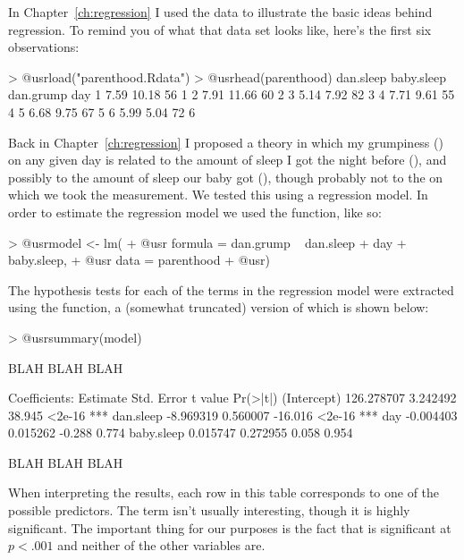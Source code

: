 
In Chapter~\ref{ch:regression} I used the  data to illustrate the basic ideas behind regression. To remind you of what that data set looks like, here's the first six observations:
\begin{rblock1}
> @usr{load("parenthood.Rdata")}
> @usr{head(parenthood)}
  dan.sleep baby.sleep dan.grump day
1      7.59      10.18        56   1
2      7.91      11.66        60   2
3      5.14       7.92        82   3
4      7.71       9.61        55   4
5      6.68       9.75        67   5
6      5.99       5.04        72   6
\end{rblock1}

\noindent
Back in Chapter~\ref{ch:regression} I proposed a theory in which my grumpiness () on any given day is related to the amount of sleep I got the night before (), and possibly to the amount of sleep our baby got (), though probably not to the  on which we took the measurement. We tested this using a regression model. In order to estimate the regression model we used the  function, like so:

\begin{rblock1}
> @usr{model <- lm(} 
+ @usr{   formula = dan.grump ~ dan.sleep + day + baby.sleep,}
+ @usr{   data = parenthood}
+ @usr{)}
\end{rblock1}
The hypothesis tests for each of the terms in the regression model were extracted using the  function, a (somewhat truncated) version of which is shown below:
\begin{rblock1}
> @usr{summary(model)}

BLAH BLAH BLAH

Coefficients:
              Estimate Std. Error t value Pr(>|t|)    
(Intercept) 126.278707   3.242492  38.945   <2e-16 ***
dan.sleep    -8.969319   0.560007 -16.016   <2e-16 ***
day          -0.004403   0.015262  -0.288    0.774    
baby.sleep    0.015747   0.272955   0.058    0.954    

BLAH BLAH BLAH
\end{rblock1}
When interpreting the results, each row in this table corresponds to one of the possible predictors. The  term isn't usually interesting, though it is highly significant. The important thing for our purposes is the fact that  is significant at $p<.001$ and neither of the other variables are. 

